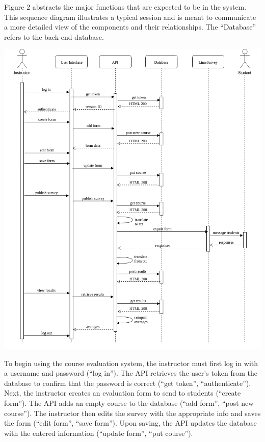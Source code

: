 \documentclass{article}
\begin{document}
Figure 2 abstracts the major functions that are expected to be in the system. This sequence diagram illustrates a typical session and is meant to communicate a more detailed view of the components and their relationships. The ``Database'' refers to the back-end database.

\begin{center}
\label{fig:sequencediagram}
{\includegraphics[scale=.62]{images/sequence_diagram.png}} 
\end{center}

To begin using the course evaluation system, the instructor must first log in with a username and password (``log in''). The API retrieves the user's token from the database to confirm that the password is correct (``get token'', ``authenticate''). Next, the instructor creates an evaluation form to send to students (``create form''). The API adds an empty course to the database (``add form'', ``post new course''). The instructor then edits the survey with the appropriate info and saves the form (``edit form'', ``save form''). Upon saving, the API updates the database with the entered information (``update form'', ``put course'').
\end{document}
